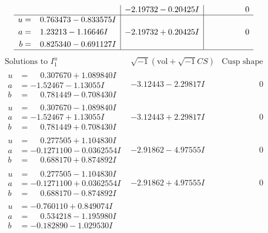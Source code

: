 \documentclass[1p]{elsarticle_modified}
\theoremstyle{definition}
\newcommand{\I}{\sqrt{-1}}
\begin{document}
$$\begin{array}{c|c|c}
 & -2.19732 - 0.20425 I & \phantom{-0.000000 } 0 \\ \hline\begin{aligned}
u &= \phantom{-}0.763473 - 0.833575 I \\
a &= \phantom{-}1.23213 - 1.16646 I \\
b &= \phantom{-}0.825340 - 0.691127 I\end{aligned}
 & -2.19732 + 0.20425 I & \phantom{-0.000000 } 0\\
 \hline 
 \end{array}$$\newpage$$\begin{array}{c|c|c}  
\text{Solutions to }I^u_{1}& \I (\text{vol} + \sqrt{-1}CS) & \text{Cusp shape}\\
 \hline 
\begin{aligned}
u &= \phantom{-}0.307670 + 1.089840 I \\
a &= -1.52467 - 1.13055 I \\
b &= \phantom{-}0.781449 - 0.708430 I\end{aligned}
 & -3.12443 - 2.29817 I & \phantom{-0.000000 } 0 \\ \hline\begin{aligned}
u &= \phantom{-}0.307670 - 1.089840 I \\
a &= -1.52467 + 1.13055 I \\
b &= \phantom{-}0.781449 + 0.708430 I\end{aligned}
 & -3.12443 + 2.29817 I & \phantom{-0.000000 } 0 \\ \hline\begin{aligned}
u &= \phantom{-}0.277505 + 1.104830 I \\
a &= -0.1271100 - 0.0362554 I \\
b &= \phantom{-}0.688170 + 0.874892 I\end{aligned}
 & -2.91862 - 4.97555 I & \phantom{-0.000000 } 0 \\ \hline\begin{aligned}
u &= \phantom{-}0.277505 - 1.104830 I \\
a &= -0.1271100 + 0.0362554 I \\
b &= \phantom{-}0.688170 - 0.874892 I\end{aligned}
 & -2.91862 + 4.97555 I & \phantom{-0.000000 } 0 \\ \hline\begin{aligned}
u &= -0.760110 + 0.849074 I \\
a &= \phantom{-}0.534218 - 1.195980 I \\
b &= -0.182890 - 1.029530 I\end{aligned}

\end{array}$$
\end{document}
